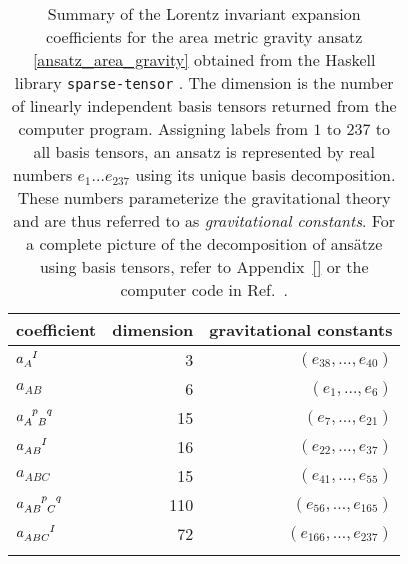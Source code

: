\begin{table}
  \centering
  \begin{tabular}{l r r}
    \toprule
    coefficient & dimension & gravitational constants \\
    \midrule
    $a_A^{\hphantom AI}$ & 3 & $(e_{38},\dots ,e_{40})$ \\ \addlinespace[2pt]
    $a_{AB}$ & 6 & $(e_{1},\dots ,e_{6})$ \\ \addlinespace[2pt]
    $a_{A\hphantom pB}^{\hphantom Ap\hphantom Bq}$ & 15 & $(e_{7},\dots ,e_{21})$ \\ \addlinespace[2pt]
    $a_{AB}^{\hphantom{AB}I}$ & 16 & $(e_{22},\dots ,e_{37})$ \\ \addlinespace[2pt]
    $a_{ABC}$ & 15 & $(e_{41},\dots ,e_{55})$ \\ \addlinespace[2pt]
    $a_{AB\hphantom pC}^{\hphantom{AB}p\hphantom Cq}$ & 110 & $(e_{56},\dots ,e_{165})$ \\ \addlinespace[2pt]
    $a_{ABC}^{\hphantom{ABC}I}$ & 72 & $(e_{166},\dots ,e_{237})$ \\ \addlinespace[2pt]
    \bottomrule 
  \end{tabular}
  \caption{Summary of the Lorentz invariant expansion coefficients for the area metric gravity ansatz \eqref{ansatz_area_gravity} obtained from the Haskell library \texttt{sparse-tensor} \cite{}. The dimension is the number of linearly independent basis tensors returned from the computer program. Assigning labels from $1$ to $237$ to all basis tensors, an ansatz is represented by real numbers $e_1\dots e_{237}$ using its unique basis decomposition. These numbers parameterize the gravitational theory and are thus referred to as \emph{gravitational constants}. For a complete picture of the decomposition of ansätze using basis tensors, refer to Appendix~\ref{} or the computer code in Ref.~\cite{Alex_2020_area-metric-gravity}.}
\end{table}

